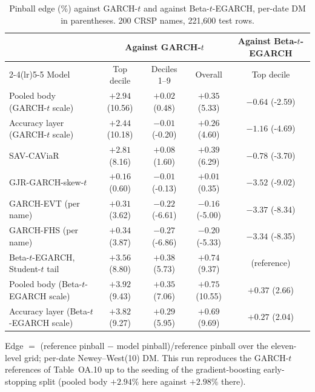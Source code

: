 \documentclass[11pt]{article}
\begin{document}
\begin{table}[htbp]
\centering
\begin{threeparttable}
\caption{Pinball edge (\%) against GARCH-$t$ and against Beta-$t$-EGARCH, per-date DM in parentheses. 200 CRSP names, 221,600 test rows.}
\label{tab:attribution}
\footnotesize\setlength{\tabcolsep}{4pt}
\begin{tabular}{lcccc}
\toprule
& \multicolumn{3}{c}{Against GARCH-$t$} & Against Beta-$t$-EGARCH \\
\cmidrule(lr){2-4}\cmidrule(lr){5-5}
Model & Top decile & Deciles 1--9 & Overall & Top decile \\
\midrule
Pooled body (GARCH-$t$ scale) & $+2.94$ (10.56) & $+0.02$ (0.48) & $+0.35$ (5.33) & $-0.64$ (-2.59) \\
Accuracy layer (GARCH-$t$ scale) & $+2.44$ (10.18) & $-0.01$ (-0.20) & $+0.26$ (4.60) & $-1.16$ (-4.69) \\
SAV-CAViaR & $+2.81$ (8.16) & $+0.08$ (1.60) & $+0.39$ (6.29) & $-0.78$ (-3.70) \\
GJR-GARCH-skew-$t$ & $+0.16$ (0.60) & $-0.01$ (-0.13) & $+0.01$ (0.35) & $-3.52$ (-9.02) \\
GARCH-EVT (per name) & $+0.31$ (3.62) & $-0.22$ (-6.61) & $-0.16$ (-5.00) & $-3.37$ (-8.34) \\
GARCH-FHS (per name) & $+0.34$ (3.87) & $-0.27$ (-6.86) & $-0.20$ (-5.33) & $-3.34$ (-8.35) \\
Beta-$t$-EGARCH, Student-$t$ tail & $+3.56$ (8.80) & $+0.38$ (5.73) & $+0.74$ (9.37) & (reference) \\
Pooled body (Beta-$t$-EGARCH scale) & $+3.92$ (9.43) & $+0.35$ (7.06) & $+0.75$ (10.55) & $+0.37$ (2.66) \\
Accuracy layer (Beta-$t$-EGARCH scale) & $+3.82$ (9.27) & $+0.29$ (5.95) & $+0.69$ (9.69) & $+0.27$ (2.04) \\
\bottomrule
\end{tabular}
\begin{tablenotes}\footnotesize
\item Edge $=$ (reference pinball $-$ model pinball)/reference pinball over the eleven-level grid; per-date Newey--West(10) DM. This run reproduces the GARCH-$t$ references of Table~OA.10 up to the seeding of the gradient-boosting early-stopping split (pooled body $+2.94\%$ here against $+2.98\%$ there).
\end{tablenotes}
\end{threeparttable}
\end{table}
\end{document}
